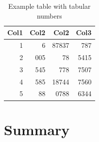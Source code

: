 \documentclass[12pt, a4paper, oneside]{article}
\begin{document}
\begin{table}[h]
    \centering
    \renewcommand{\arraystretch}{1.2}
    \setlength{\tabcolsep}{16pt}
    \caption[Example table]{Example table with tabular numbers}
    \begin{tabular}{rrrr}
        \toprule
        \textbf{Col1} & \textbf{Col2} & \textbf{Col2} & \textbf{Col3} \\
        \midrule
        1             & 6             & 87837         & 787           \\
        2             & 005           & 78            & 5415          \\
        3             & 545           & 778           & 7507          \\
        4             & 585           & 18744         & 7560          \\
        5             & 88            & 0788          & 6344          \\
        \bottomrule
    \end{tabular}
    \label{tab:numbers}
\end{table}

\blindtext[2]

\clearpage


\section{Summary} \label{sec:summary}

\blindtext[3]

\clearpage


\nocite{*}

{
    \raggedright
    \printbibliography
}

\clearpage


\appendix
{} \label{sec:appendix}

\renewcommand{\thesubsection}{\Alph{subsection}}
\end{document}
